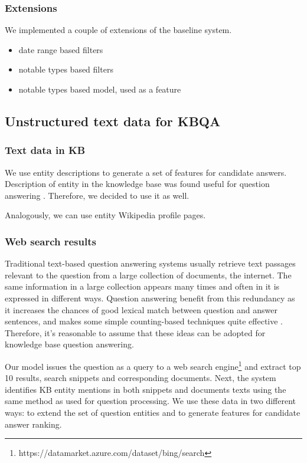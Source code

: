 \subsubsection{Extensions}
We implemented a couple of extensions of the baseline system.

\begin{itemize}
\item date range based filters
\item notable types based filters
\item notable types based model, used as a feature
\end{itemize}

\subsection{Unstructured text data for KBQA}

\subsubsection{Text data in KB}
We use entity descriptions to generate a set of features for candidate answers.
Description of entity in the knowledge base was found useful for question answering \cite{Sun:2015:ODQ:2736277.2741651}.
Therefore, we decided to use it as well.

Analogously, we can use entity Wikipedia profile pages.

\subsubsection{Web search results}

Traditional text-based question answering systems usually retrieve text passages relevant to the question from a large collection of documents, \eg the internet.
The same information in a large collection appears many times and often in it is expressed in different ways.
Question answering benefit from this redundancy \cite{Lin:2007:EPU:1229179.1229180} as it increases the chances of good lexical match between question and answer sentences, and makes some simple counting-based techniques quite effective \cite{brill2002analysis}.
Therefore, it's reasonable to assume that these ideas can be adopted for knowledge base question answering.

Our model issues the question as a query to a web search engine\footnote{https://datamarket.azure.com/dataset/bing/search} and extract top 10 results, \ie search snippets and corresponding documents.
Next, the system identifies KB entity mentions in both snippets and documents texts using the same method as used for question processing.
We use these data in two different ways: to extend the set of question entities and to generate features for candidate answer ranking.

